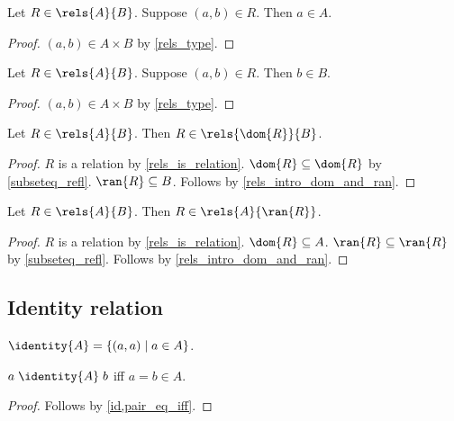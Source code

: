 \begin{proposition}\label{rels_type_dom}
    Let $R\in\rels{A}{B}$.
    Suppose $(a,b)\in R$.
    Then $a\in A$.
\end{proposition}
\begin{proof}
    $(a,b)\in A\times B$ by \cref{rels_type}.
\end{proof}

\begin{proposition}\label{rels_type_ran}
    Let $R\in\rels{A}{B}$.
    Suppose $(a,b)\in R$.
    Then $b\in B$.
\end{proposition}
\begin{proof}
    $(a,b)\in A\times B$ by \cref{rels_type}.
\end{proof}

\begin{proposition}\label{rels_restrict_dom}
    Let $R\in\rels{A}{B}$.
    Then $R\in\rels{\dom{R}}{B}$.
\end{proposition}
\begin{proof}
    $R$ is a relation by \cref{rels_is_relation}.
    $\dom{R}\subseteq \dom{R}$ by \cref{subseteq_refl}.
    $\ran{R}\subseteq B$.
    Follows by \cref{rels_intro_dom_and_ran}.
\end{proof}

\begin{proposition}\label{rels_restrict_ran}
    Let $R\in\rels{A}{B}$.
    Then $R\in\rels{A}{\ran{R}}$.
\end{proposition}
\begin{proof}
    $R$ is a relation by \cref{rels_is_relation}.
    $\dom{R}\subseteq A$.
    $\ran{R}\subseteq \ran{R}$ by \cref{subseteq_refl}.
    Follows by \cref{rels_intro_dom_and_ran}.
\end{proof}

\subsection{Identity relation}

\begin{definition}\label{id}
    $\identity{A} = \{(a,a)\mid a\in A\}$.
\end{definition}

\begin{proposition}\label{id_iff}
    $a\mathrel{\identity{A}}b$ iff $a = b\in A$.
\end{proposition}
\begin{proof}
    Follows by \cref{id,pair_eq_iff}.
\end{proof}

